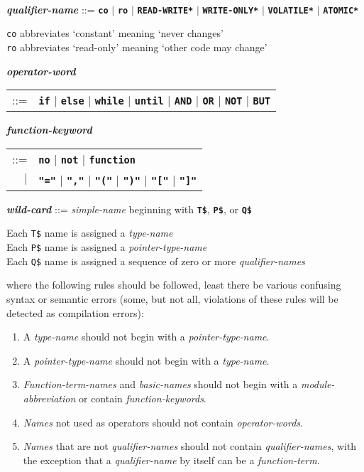 \documentclass[12pt]{article}
\newcommand{\TT}[1]{{\tt \bfseries #1}}
\newcommand{\ttkey}[1]{{\tt \bfseries #1}}
\newcommand{\emkey}[1]{{\em \bfseries #1}}
\newcommand{\ttakey}[1]{{\tt \bfseries *#1*}}
\newenvironment{indpar}[1][0.3in]%
	{\begin{list}{}%
		     {\setlength{\itemsep}{0in}%
		      \setlength{\topsep}{0in}%
		      \setlength{\parsep}{1ex}%
		      \setlength{\labelwidth}{#1}%
		      \setlength{\leftmargin}{#1}%
		      \addtolength{\leftmargin}{\labelsep}}%
	 \item}%
	{\end{list}}
\begin{document}
\begin{indpar}
\\[1ex]
\emkey{qualifier-name}\label{QUALIFIER-NAME} ::=
    \ttkey{co} $|$ \ttkey{ro} $|$ \ttakey{READ-WRITE} $|$
    \ttakey{WRITE-ONLY} $|$ \ttakey{VOLATILE} $|$ \ttakey{ATOMIC}
\begin{indpar}
{\tt co} abbreviates `constant' meaning `never changes' \\
{\tt ro} abbreviates `read-only' meaning `other code may change'
\end{indpar}
\emkey{operator-word}
    \begin{tabular}[t]{rl}
    ::= & \TT{if} $|$ \TT{else} $|$ \TT{while} $|$ \TT{until}
                  $|$ \TT{AND} $|$ \TT{OR}
		  $|$ \TT{NOT} $|$ \TT{BUT}
    \end{tabular}

\emkey{function-keyword}
    \begin{tabular}[t]{rl}
    ::= & \TT{no} $|$ \TT{not} $|$ \TT{function} \\
    $|$ & \TT{"="} $|$ \TT{","} $|$ \TT{"("} $|$ \TT{")"} $|$
          \TT{"["} $|$ \TT{"]"}
    \end{tabular}

\emkey{wild-card}\label{WILD-CARD}
    ::= {\em simple-name} beginning with \TT{T\$}, \TT{P\$}, or \TT{Q\$}
\begin{indpar}
Each {\tt T\$} name is assigned a {\em type-name} \\
Each {\tt P\$} name is assigned a {\em pointer-type-name} \\
Each {\tt Q\$} name is assigned a sequence of zero or more
               {\em qualifier-names}
\end{indpar}

where the following rules should be followed, least there be
various confusing syntax or semantic errors (some, but not all,
violations of these rules will be detected as compilation errors):
\begin{enumerate}
\item
A {\em type-name} should not begin with a {\em pointer-type-name}.
\item
A {\em pointer-type-name} should not begin with a {\em type-name}.
\item
{\em Function-term-names} and {\em basic-names}
should not begin with a {\em module-abbre\-viation}
or contain {\em function-keywords}.
\item
{\em Names} not used as operators should not contain {\em operator-words}.
\item
{\em Names} that are not {\em qualifier-names}
should not contain {\em qualifier-names}, with the
exception that a {\em qualifier-name} by itself can be
a {\em function-term}.
\end{enumerate}
\end{indpar}
\end{document}
